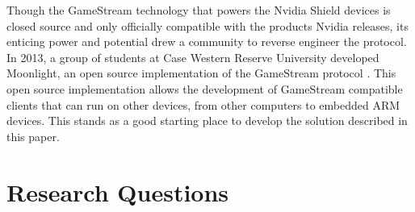 Though the GameStream technology that powers the Nvidia Shield devices is closed source and only officially compatible with the products Nvidia releases, its enticing power and potential drew a community to reverse engineer the protocol.
In 2013, a group of students at Case Western Reserve University developed Moonlight, an open source implementation of the GameStream protocol \cite{moonlight}.
This open source implementation allows the development of GameStream compatible clients that can run on other devices, from other computers to embedded ARM devices.
This stands as a good starting place to develop the solution described in this paper.

\section{Research Questions}\label{sec:ResearchQuestions}
\todosection